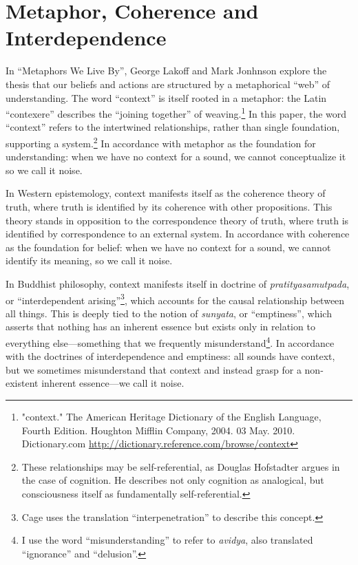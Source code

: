 \documentclass{thesis}
\begin{document}
\section{Metaphor, Coherence and Interdependence}

In ``Metaphors We Live By'', George Lakoff and Mark Jonhnson explore the thesis that our beliefs and actions are structured by a metaphorical ``web'' of understanding. The word ``context'' is itself rooted in a metaphor: the Latin ``contexere'' describes the ``joining together'' of weaving.\footnote{"context." The American Heritage Dictionary of the English Language, Fourth Edition. Houghton Mifflin Company, 2004. 03 May. 2010. Dictionary.com \url{http://dictionary.reference.com/browse/context}} In this paper, the word ``context'' refers to the intertwined relationships, rather than single foundation, supporting a system.\footnote{These relationships may be self-referential, as Douglas Hofstadter argues in the case of cognition.\cite{Hofstadter01} He describes not only cognition as analogical, but consciousness itself as fundamentally self-referential\cite{Hofstadter07}.} In accordance with metaphor as the foundation for understanding: when we have no context for a sound, we cannot conceptualize it so we call it noise.

In Western epistemology, context manifests itself as the coherence theory of truth\cite{Blackburn07}\cite{young_coherence_????}, where truth is identified by its coherence with other propositions. This theory stands in opposition to the correspondence\cite{david_correspondence_????} theory of truth, where truth is identified by correspondence to an external system. In accordance with coherence as the foundation for belief: when we have no context for a sound, we cannot identify its meaning, so we call it noise.

In Buddhist philosophy, context manifests itself in doctrine of \emph{pratityasamutpada}, or ``interdependent arising''\footnote{Cage uses the translation ``interpenetration'' to describe this concept.}, which accounts for the causal relationship between all things.\cite{Koller01} This is deeply tied to the notion of \emph{sunyata}, or ``emptiness'', which asserts that nothing has an inherent essence but exists only in relation to everything else---something that we frequently misunderstand\footnote{I use the word ``misunderstanding'' to refer to \emph{avidya}, also translated ``ignorance'' and ``delusion''.}. In accordance with the doctrines of interdependence and emptiness: all sounds have context, but we sometimes misunderstand that context and instead grasp for a non-existent inherent essence---we call it noise.
\end{document}
